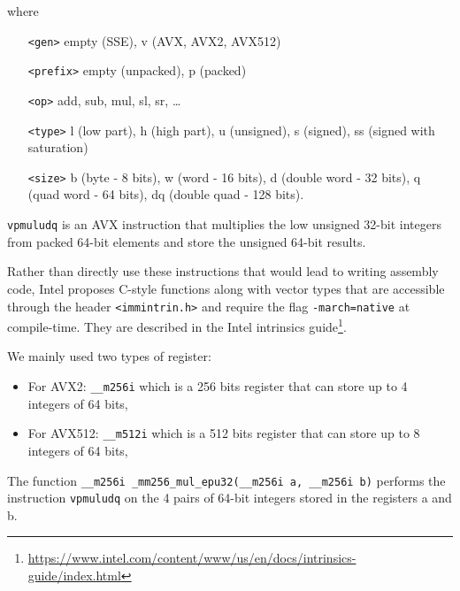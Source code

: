 \documentclass[a4paper]{article}
\begin{document}
where
\begin{center}
    \begin{minipage}{12cm}
        \begin{itemize}
            \item[\texttt{<gen>}] empty (SSE), v (AVX, AVX2, AVX512)
            \item[\texttt{<prefix>}] empty (unpacked), p (packed)
            \item[\texttt{<op>}] add, sub, mul, sl, sr, \dots
            \item[\texttt{<type>}] l (low part), h (high part), u (unsigned), s (signed), ss (signed with saturation)
            \item[\texttt{<size>}] b (byte - 8 bits), w (word - 16 bits), d (double word - 32 bits), q (quad word - 64 bits), 
            dq (double quad - 128 bits).
        \end{itemize}
    \end{minipage}
\end{center}


\begin{example}
    \texttt{vpmuludq} is an AVX instruction that multiplies the low unsigned 32-bit integers from packed 64-bit elements
    and store the unsigned 64-bit results.
\end{example}

\bigskip
Rather than directly use these instructions that would lead to writing assembly code, Intel proposes C-style functions
along with vector types that are accessible through the header \texttt{<immintrin.h>} and require the flag \texttt{-march=native} at 
compile-time.
They are described in the Intel intrinsics guide\footnote{\url{https://www.intel.com/content/www/us/en/docs/intrinsics-guide/index.html}}.

\bigskip
We mainly used two types of register: 
\begin{itemize}
    \item For AVX2: \texttt{\_\_m256i} which is a 256 bits register that can store up to 4 integers of 64 bits,
    \item For AVX512: \texttt{\_\_m512i} which is a 512 bits register that can store up to 8 integers of 64 bits,
\end{itemize}


\begin{example}
    The function \texttt{\_\_m256i \_mm256\_mul\_epu32(\_\_m256i a, \_\_m256i b)} performs the instruction \texttt{vpmuludq}
    on the 4 pairs of 64-bit integers stored in the registers a and b.
\end{example}
\end{document}
